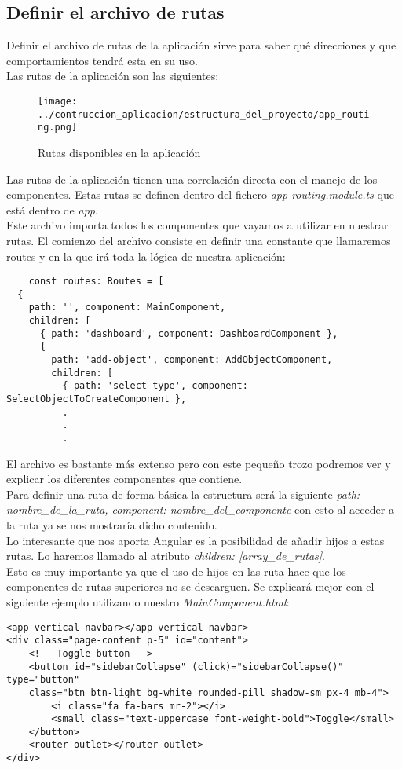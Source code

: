 \subsection{Definir el archivo de rutas}
Definir el archivo de rutas de la aplicación sirve para saber qué direcciones y que comportamientos tendrá esta en su uso.
\\Las rutas de la aplicación son las siguientes:

\begin{figure}[h]
    \centering
    \texttt{[image: ../contruccion\_aplicacion/estructura\_del\_proyecto/app\_routing.png]}
    \caption{Rutas disponibles en la aplicación}
\end{figure}

Las rutas de la aplicación tienen una correlación directa con el manejo de los componentes. Estas rutas se definen dentro del fichero \textit{app-routing.module.ts} que está dentro de \textit{app}.
\\Este archivo importa todos los componentes que vayamos a utilizar en nuestrar rutas. El comienzo del archivo consiste en definir una constante que llamaremos routes y en la que irá toda la lógica de nuestra aplicación:
\begin{verbatim}
    const routes: Routes = [
  {
    path: '', component: MainComponent,
    children: [
      { path: 'dashboard', component: DashboardComponent },
      {
        path: 'add-object', component: AddObjectComponent,
        children: [
          { path: 'select-type', component: SelectObjectToCreateComponent },
          .
          .
          .
\end{verbatim}
El archivo es bastante más extenso pero con este pequeño trozo podremos ver y explicar los diferentes componentes que contiene.
\\Para definir una ruta de forma básica la estructura será la siguiente \textit{path: nombre\_de\_la\_ruta, component: nombre\_del\_componente} con esto al acceder a la ruta ya se nos mostraría dicho contenido.
\\Lo interesante que nos aporta Angular es la posibilidad de añadir hijos a estas rutas. Lo haremos llamado al atributo \textit{children: [array\_de\_rutas]}.
\\Esto es muy importante ya que el uso de hijos en las ruta hace que los componentes de rutas superiores no se descarguen. Se explicará mejor con el siguiente ejemplo utilizando nuestro \textit{MainComponent.html}:
\begin{verbatim}
<app-vertical-navbar></app-vertical-navbar>
<div class="page-content p-5" id="content">
    <!-- Toggle button -->
    <button id="sidebarCollapse" (click)="sidebarCollapse()" type="button"
    class="btn btn-light bg-white rounded-pill shadow-sm px-4 mb-4">
        <i class="fa fa-bars mr-2"></i>
        <small class="text-uppercase font-weight-bold">Toggle</small>
    </button>
    <router-outlet></router-outlet>
</div>
\end{verbatim}
